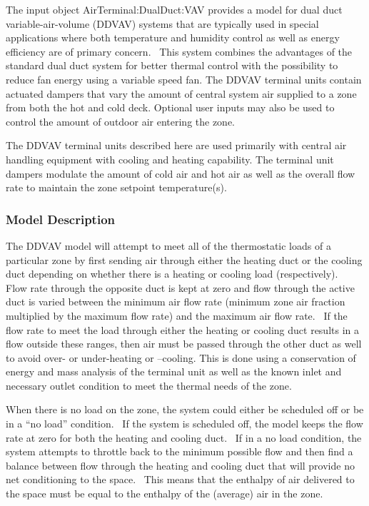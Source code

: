 The input object AirTerminal:DualDuct:VAV provides a model for dual duct variable-air-volume (DDVAV) systems that are typically used in special applications where both temperature and humidity control as well as energy efficiency are of primary concern.~ This system combines the advantages of the standard dual duct system for better thermal control with the possibility to reduce fan energy using a variable speed fan. The DDVAV terminal units contain actuated dampers that vary the amount of central system air supplied to a zone from both the hot and cold deck. Optional user inputs may also be used to control the amount of outdoor air entering the zone.

The DDVAV terminal units described here are used primarily with central air handling equipment with cooling and heating capability. The terminal unit dampers modulate the amount of cold air and hot air as well as the overall flow rate to maintain the zone setpoint temperature(s).

\subsubsection{Model Description}\label{model-description-3-000}

The DDVAV model will attempt to meet all of the thermostatic loads of a particular zone by first sending air through either the heating duct or the cooling duct depending on whether there is a heating or cooling load (respectively).~ Flow rate through the opposite duct is kept at zero and flow through the active duct is varied between the minimum air flow rate (minimum zone air fraction multiplied by the maximum flow rate) and the maximum air flow rate.~ If the flow rate to meet the load through either the heating or cooling duct results in a flow outside these ranges, then air must be passed through the other duct as well to avoid over- or under-heating or --cooling. This is done using a conservation of energy and mass analysis of the terminal unit as well as the known inlet and necessary outlet condition to meet the thermal needs of the zone.

When there is no load on the zone, the system could either be scheduled off or be in a ``no load'' condition.~ If the system is scheduled off, the model keeps the flow rate at zero for both the heating and cooling duct.~ If in a no load condition, the system attempts to throttle back to the minimum possible flow and then find a balance between flow through the heating and cooling duct that will provide no net conditioning to the space.~ This means that the enthalpy of air delivered to the space must be equal to the enthalpy of the (average) air in the zone.

